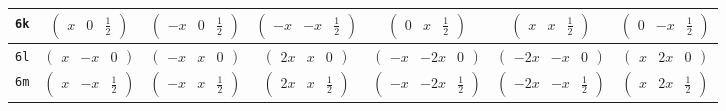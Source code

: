 \documentclass[fleqn,9pt,landscape]{jsarticle}
\begin{document}
\begin{center}
\begin{longtable}{ccccccc}
{\tt 6k} & $ \begin{pmatrix} x & 0 & \frac{1}{2} \end{pmatrix} $ & $ \begin{pmatrix} - x & 0 & \frac{1}{2} \end{pmatrix} $ & $ \begin{pmatrix} - x & - x & \frac{1}{2} \end{pmatrix} $ & $ \begin{pmatrix} 0 & x & \frac{1}{2} \end{pmatrix} $ & $ \begin{pmatrix} x & x & \frac{1}{2} \end{pmatrix} $ & $ \begin{pmatrix} 0 & - x & \frac{1}{2} \end{pmatrix} $ \\ \hline
{\tt 6l} & $ \begin{pmatrix} x & - x & 0 \end{pmatrix} $ & $ \begin{pmatrix} - x & x & 0 \end{pmatrix} $ & $ \begin{pmatrix} 2 x & x & 0 \end{pmatrix} $ & $ \begin{pmatrix} - x & - 2 x & 0 \end{pmatrix} $ & $ \begin{pmatrix} - 2 x & - x & 0 \end{pmatrix} $ & $ \begin{pmatrix} x & 2 x & 0 \end{pmatrix} $ \\ \hline
{\tt 6m} & $ \begin{pmatrix} x & - x & \frac{1}{2} \end{pmatrix} $ & $ \begin{pmatrix} - x & x & \frac{1}{2} \end{pmatrix} $ & $ \begin{pmatrix} 2 x & x & \frac{1}{2} \end{pmatrix} $ & $ \begin{pmatrix} - x & - 2 x & \frac{1}{2} \end{pmatrix} $ & $ \begin{pmatrix} - 2 x & - x & \frac{1}{2} \end{pmatrix} $ & $ \begin{pmatrix} x & 2 x & \frac{1}{2} \end{pmatrix} $ \\ \hline

\end{longtable}
\end{center}
\end{document}
